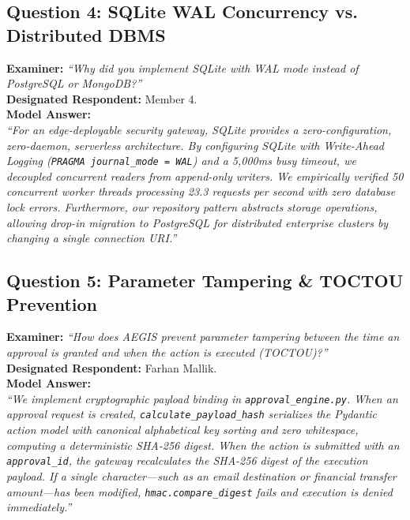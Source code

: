 \subsection{Question 4: SQLite WAL Concurrency vs. Distributed DBMS}
\textbf{Examiner:} \textit{``Why did you implement SQLite with WAL mode instead of PostgreSQL or MongoDB?''} \\
\textbf{Designated Respondent:} Member 4. \\
\textbf{Model Answer:} \\
\textit{``For an edge-deployable security gateway, SQLite provides a zero-configuration, zero-daemon, serverless architecture. By configuring SQLite with Write-Ahead Logging (\texttt{PRAGMA journal\_mode = WAL}) and a 5,000ms busy timeout, we decoupled concurrent readers from append-only writers. We empirically verified 50 concurrent worker threads processing 23.3 requests per second with zero database lock errors. Furthermore, our repository pattern abstracts storage operations, allowing drop-in migration to PostgreSQL for distributed enterprise clusters by changing a single connection URI.''}

\subsection{Question 5: Parameter Tampering \& TOCTOU Prevention}
\textbf{Examiner:} \textit{``How does AEGIS prevent parameter tampering between the time an approval is granted and when the action is executed (TOCTOU)?''} \\
\textbf{Designated Respondent:} Farhan Mallik. \\
\textbf{Model Answer:} \\
\textit{``We implement cryptographic payload binding in \texttt{approval\_engine.py}. When an approval request is created, \texttt{calculate\_payload\_hash} serializes the Pydantic action model with canonical alphabetical key sorting and zero whitespace, computing a deterministic SHA-256 digest. When the action is submitted with an \texttt{approval\_id}, the gateway recalculates the SHA-256 digest of the execution payload. If a single character—such as an email destination or financial transfer amount—has been modified, \texttt{hmac.compare\_digest} fails and execution is denied immediately.''}

